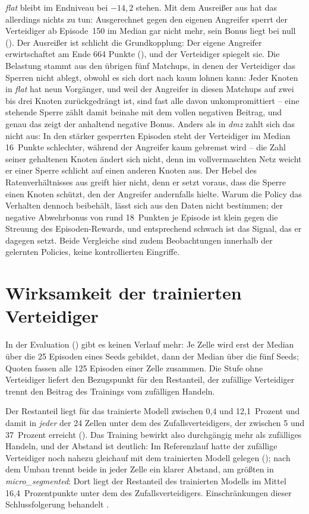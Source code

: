 \emph{flat} bleibt im Endniveau bei $-14{,}2$ stehen. Mit dem Ausreißer aus
 hat das allerdings nichts zu tun: Ausgerechnet gegen
den eigenen Angreifer sperrt der Verteidiger ab Episode~150 im Median gar
nicht mehr, sein Bonus liegt bei null (). Der Ausreißer ist schlicht die
Grundkopplung: Der eigene Angreifer erwirtschaftet am Ende 664 Punkte
(), und der Verteidiger spiegelt sie. Die Belastung stammt aus den übrigen
fünf Matchups, in denen der Verteidiger das Sperren nicht ablegt, obwohl es
sich dort nach  kaum lohnen kann: Jeder Knoten in
\emph{flat} hat neun Vorgänger, und weil der Angreifer in diesen Matchups
auf zwei bis drei Knoten zurückgedrängt ist, sind fast alle davon
unkompromittiert -- eine stehende Sperre zählt damit beinahe mit dem vollen
negativen Beitrag, und genau das zeigt der anhaltend negative Bonus. Anders als in \emph{dmz} zahlt sich das nicht aus: In den stärker
gesperrten Episoden steht der Verteidiger im Median 16~Punkte schlechter,
während der Angreifer kaum gebremst wird -- die Zahl seiner gehaltenen
Knoten ändert sich nicht, denn im vollvermaschten Netz weicht er einer
Sperre schlicht auf einen anderen Knoten aus. Der Hebel des
Ratenverhältnisses aus  greift hier nicht, denn er
setzt voraus, dass die Sperre einen Knoten schützt, den der Angreifer
andernfalls hielte. Warum die Policy das Verhalten dennoch beibehält, lässt
sich aus den Daten nicht bestimmen; der negative Abwehrbonus von rund 18~Punkten je Episode ist
klein gegen die Streuung des Episoden-Rewards, und entsprechend schwach ist
das Signal, das er dagegen setzt. Beide Vergleiche sind zudem Beobachtungen innerhalb der gelernten
Policies, keine kontrollierten Eingriffe.

\section{Wirksamkeit der trainierten Verteidiger}
\label{sec:wirksamkeitergebnis}

In der Evaluation () gibt es keinen Verlauf mehr: Je Zelle wird
erst der Median über die 25 Episoden eines Seeds gebildet, dann der Median
über die fünf Seeds; Quoten fassen alle 125 Episoden einer Zelle zusammen.
Die Stufe ohne Verteidiger liefert den Bezugspunkt für den Restanteil, der
zufällige Verteidiger trennt den Beitrag des Trainings vom zufälligen Handeln.

Der Restanteil liegt für das trainierte
Modell zwischen 0,4 und 12,1~Prozent und damit in \emph{jeder} der 24 Zellen
unter dem des Zufallsverteidigers, der zwischen 5 und 37~Prozent erreicht
(). Das Training bewirkt also
durchgängig mehr als zufälliges Handeln, und der Abstand ist deutlich: Im
Referenzlauf hatte der zufällige Verteidiger noch nahezu gleichauf mit dem
trainierten Modell gelegen (); nach dem Umbau
trennt beide in jeder Zelle ein klarer Abstand, am größten in
\emph{micro\_segmented}: Dort liegt der Restanteil des trainierten
Modells im Mittel 16,4~Prozentpunkte unter dem des
Zufallsverteidigers. Einschränkungen
dieser Schlussfolgerung behandelt .

